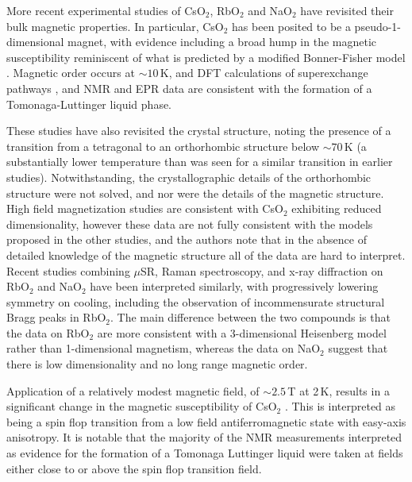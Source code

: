 \documentclass[prb,aps,twocolumn,superscriptaddress,showpacs,footinbib]{revtex4-2}
\newcommand{\cso}{CsO$_{2}$ }
\newcommand{\rbo}{RbO$_{2}$ }
\begin{document}
More recent experimental studies of CsO$_{2}$, RbO$_{2}$ and NaO$_{2}$ have revisited their bulk magnetic properties. In particular, \cso has been posited to be a pseudo-1-dimensional magnet, with evidence including a broad hump in the magnetic susceptibility reminiscent of what is predicted by a modified Bonner-Fisher model \cite{Bonner1965}. Magnetic order occurs at $\sim 10$\,K, and DFT calculations of superexchange pathways \cite{Riyadi2012}, and NMR \cite{Klanjsek2015} and EPR \cite{Knaflic2015} data are consistent with the formation of a Tomonaga-Luttinger liquid phase.

These studies have also revisited the crystal structure, noting the presence of a transition from a tetragonal to an orthorhombic structure below $\sim 70$\,K (a substantially lower temperature than was seen for a similar transition in earlier studies). Notwithstanding, the crystallographic details of the orthorhombic structure were not solved, and nor were the details of the magnetic structure. High field magnetization studies \cite{Miyajima2018} are consistent with \cso exhibiting reduced dimensionality, however these data are not fully consistent with the models proposed in the other studies, and the authors note that in the absence of detailed knowledge of the magnetic structure all of the data are hard to interpret. Recent studies combining $\mu$SR, Raman spectroscopy, and x-ray diffraction on \rbo \cite{Astuti2019} and NaO$_{2}$ \cite{Miyajima2021} have been interpreted similarly, with progressively lowering symmetry on cooling, including the observation of incommensurate structural Bragg peaks in RbO$_{2}$. The main difference between the two compounds is that the data on \rbo are more consistent with a 3-dimensional Heisenberg model rather than 1-dimensional magnetism, whereas the data on NaO$_{2}$ suggest that there is low dimensionality and no long range magnetic order.

Application of a relatively modest magnetic field, of $\sim 2.5$\,T at 2\,K, results in a significant change in the magnetic susceptibility of \cso \cite{Miyajima2018}. This is interpreted as being a spin flop transition from a low field antiferromagnetic state with easy-axis anisotropy. It is notable that the majority of the NMR measurements interpreted as evidence for the formation of a Tomonaga Luttinger liquid were taken at fields either close to or above the spin flop transition field.
\end{document}

